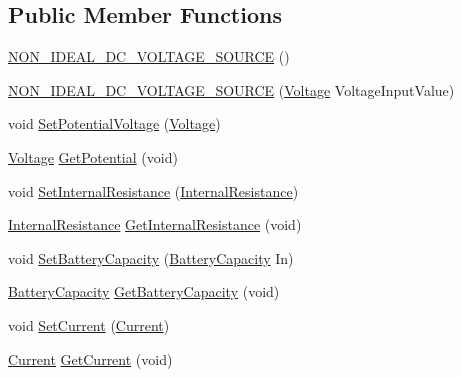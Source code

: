 \subsection*{Public Member Functions}
\begin{DoxyCompactItemize}
\item 
\hyperlink{struct_simulator_1_1_circuit_element_1_1_n_o_n___i_d_e_a_l___d_c___v_o_l_t_a_g_e___s_o_u_r_c_e_af95e17e659cf407fc93890e8f2a69b52}{N\+O\+N\+\_\+\+I\+D\+E\+A\+L\+\_\+\+D\+C\+\_\+\+V\+O\+L\+T\+A\+G\+E\+\_\+\+S\+O\+U\+R\+C\+E} ()
\item 
\hyperlink{struct_simulator_1_1_circuit_element_1_1_n_o_n___i_d_e_a_l___d_c___v_o_l_t_a_g_e___s_o_u_r_c_e_a71157a55c9ccb7e461b4b3f05afcd0f9}{N\+O\+N\+\_\+\+I\+D\+E\+A\+L\+\_\+\+D\+C\+\_\+\+V\+O\+L\+T\+A\+G\+E\+\_\+\+S\+O\+U\+R\+C\+E} (\hyperlink{_cell_8h_a4e8e2b518a83ea00ee9e8c1d36fb0852}{Voltage} Voltage\+Input\+Value)
\item 
void \hyperlink{struct_simulator_1_1_circuit_element_1_1_n_o_n___i_d_e_a_l___d_c___v_o_l_t_a_g_e___s_o_u_r_c_e_aaa61c232eee6800272a2dd9945dc3938}{Set\+Potential\+Voltage} (\hyperlink{_cell_8h_a4e8e2b518a83ea00ee9e8c1d36fb0852}{Voltage})
\item 
\hyperlink{_cell_8h_a4e8e2b518a83ea00ee9e8c1d36fb0852}{Voltage} \hyperlink{struct_simulator_1_1_circuit_element_1_1_n_o_n___i_d_e_a_l___d_c___v_o_l_t_a_g_e___s_o_u_r_c_e_adfb1bb95fb9f06bbea6a7c0caf1ba8d0}{Get\+Potential} (void)
\item 
void \hyperlink{struct_simulator_1_1_circuit_element_1_1_n_o_n___i_d_e_a_l___d_c___v_o_l_t_a_g_e___s_o_u_r_c_e_a8d268759b9a09a8ddd96d3b303768d9c}{Set\+Internal\+Resistance} (\hyperlink{_cell_8h_a14a6b3d0be7f9fce7d0209461e39f1d7}{Internal\+Resistance})
\item 
\hyperlink{_cell_8h_a14a6b3d0be7f9fce7d0209461e39f1d7}{Internal\+Resistance} \hyperlink{struct_simulator_1_1_circuit_element_1_1_n_o_n___i_d_e_a_l___d_c___v_o_l_t_a_g_e___s_o_u_r_c_e_a1b8f9c9a0af8404c255656d79065e27d}{Get\+Internal\+Resistance} (void)
\item 
void \hyperlink{struct_simulator_1_1_circuit_element_1_1_n_o_n___i_d_e_a_l___d_c___v_o_l_t_a_g_e___s_o_u_r_c_e_a846055e03d584c43b4152b0df8acb668}{Set\+Battery\+Capacity} (\hyperlink{_cell_8h_a63751574d7a92d192db8d9b44a882f00}{Battery\+Capacity} In)
\item 
\hyperlink{_cell_8h_a63751574d7a92d192db8d9b44a882f00}{Battery\+Capacity} \hyperlink{struct_simulator_1_1_circuit_element_1_1_n_o_n___i_d_e_a_l___d_c___v_o_l_t_a_g_e___s_o_u_r_c_e_a66b0005aede3039c49b1094908c8b9b8}{Get\+Battery\+Capacity} (void)
\item 
void \hyperlink{struct_simulator_1_1_circuit_element_1_1_n_o_n___i_d_e_a_l___d_c___v_o_l_t_a_g_e___s_o_u_r_c_e_aa8a53c947b7fdfb2cdf6732dcd7201ce}{Set\+Current} (\hyperlink{_cell_8h_a55c817448467f885a679a4c141bf862d}{Current})
\item 
\hyperlink{_cell_8h_a55c817448467f885a679a4c141bf862d}{Current} \hyperlink{struct_simulator_1_1_circuit_element_1_1_n_o_n___i_d_e_a_l___d_c___v_o_l_t_a_g_e___s_o_u_r_c_e_a1ec4fec0a81eb6c3562cc721b266952c}{Get\+Current} (void)
\end{DoxyCompactItemize}


